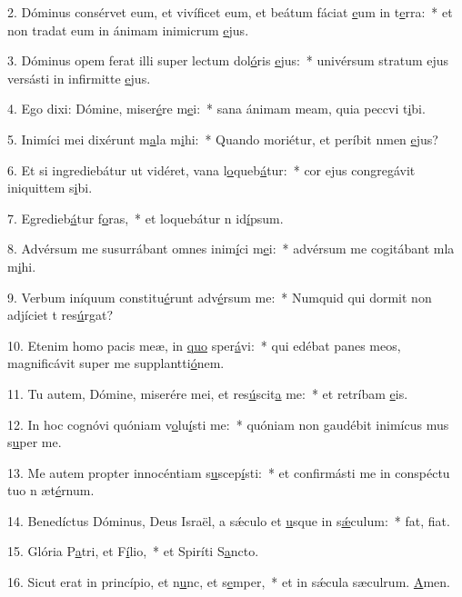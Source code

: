 2. Dóminus consérvet eum, et vivíficet eum, et beátum fáciat \uline{e}um in t\uline{e}rra:~* et non tradat eum in ánimam inimicrum \uline{e}jus.\par 
3. Dóminus opem ferat illi super lectum dol\uline{ó}ris \uline{e}jus:~* univérsum stratum ejus versásti in infirmitte \uline{e}jus.\par 
4. Ego dixi: Dómine, miser\uline{é}re m\uline{e}i:~* sana ánimam meam, quia peccvi t\uline{i}bi.\par 
5. Inimíci mei dixérunt m\uline{a}la m\uline{i}hi:~* Quando moriétur, et períbit nmen \uline{e}jus?\par 
6. Et si ingrediebátur ut vidéret, vana l\uline{o}queb\uline{á}tur:~* cor ejus congregávit iniquittem s\uline{i}bi.\par 
7. Egredieb\uline{á}tur f\uline{o}ras,~* et loquebátur n id\uline{í}psum.\par 
8. Advérsum me susurrábant omnes inim\uline{í}ci m\uline{e}i:~* advérsum me cogitábant mla m\uline{i}hi.\par 
9. Verbum iníquum constitu\uline{é}runt adv\uline{é}rsum me:~* Numquid qui dormit non adjíciet t res\uline{ú}rgat?\par 
10. Etenim homo pacis meæ, in \uline{quo} sper\uline{á}vi:~* qui edébat panes meos, magnificávit super me supplantti\uline{ó}nem.\par 
11. Tu autem, Dómine, miserére mei, et res\uline{ú}scit\uline{a} me:~* et retríbam \uline{e}is.\par 
12. In hoc cognóvi quóniam v\uline{o}lu\uline{í}sti me:~* quóniam non gaudébit inimícus mus s\uline{u}per me.\par 
13. Me autem propter innocéntiam s\uline{u}scep\uline{í}sti:~* et confirmásti me in conspéctu tuo n æt\uline{é}rnum.\par 
14. Benedíctus Dóminus, Deus Israël, a sǽculo et \uline{u}sque in s\uline{ǽ}culum:~* fat, f\uline{i}at.\par 
15. Glória P\uline{a}tri, et F\uline{í}lio,~* et Spiríti S\uline{a}ncto.\par 
16. Sicut erat in princípio, et n\uline{u}nc, et s\uline{e}mper,~* et in sǽcula sæculrum. \uline{A}men.\par 
